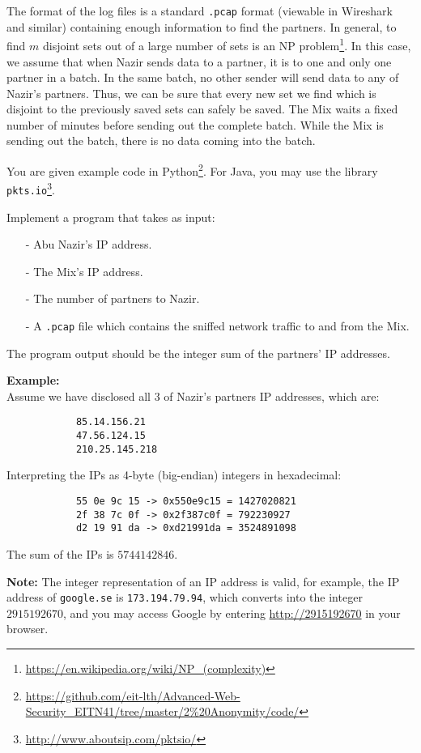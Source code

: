 \documentclass{article}
\begin{document}
\begin{description}
{		The format of the log files is a standard \texttt{.pcap} format (viewable in Wireshark and similar) containing enough information
		to find the partners. In general, to find $m$ disjoint sets out of a large number of sets is an 
		NP problem\footnote{\url{https://en.wikipedia.org/wiki/NP_(complexity)}}. In this case, we assume that when Nazir sends data to a partner,
		it is to one and only one partner in a batch. In the same batch, no other sender will send data to any of Nazir's partners. Thus,
		we can be sure that every new set we find which is disjoint to the previously saved sets can safely be saved.
		The Mix waits a fixed number of minutes before sending out the complete batch. While the Mix is sending out the batch, there is no
		data coming into the batch.

		You are given example code in Python\footnote{\url{https://github.com/eit-lth/Advanced-Web-Security_EITN41/tree/master/2\%20Anonymity/code/}}.
		For Java, you may use the library \texttt{pkts.io}\footnote{\url{http://www.aboutsip.com/pktsio/}}.

		Implement a program that takes as input:
		\begin{itemize}
			\item[-] Abu Nazir's IP address.
			\item[-] The Mix's IP address.
			\item[-] The number of partners to Nazir.
			\item[-] A \texttt{.pcap} file which contains the sniffed network traffic to and from the Mix.
		\end{itemize}
		The program output should be the integer sum of the partners' IP addresses.

		\textbf{Example:}\\
		Assume we have disclosed all 3 of Nazir's partners IP addresses, which are:
		\begin{verbatim}
			85.14.156.21
			47.56.124.15
			210.25.145.218
		\end{verbatim}
		Interpreting the IPs as 4-byte (big-endian) integers in hexadecimal:
		\begin{verbatim}
			55 0e 9c 15 -> 0x550e9c15 = 1427020821
			2f 38 7c 0f -> 0x2f387c0f = 792230927
			d2 19 91 da -> 0xd21991da = 3524891098
		\end{verbatim}
		The sum of the IPs is $5744142846$.

		\textbf{Note:} The integer representation of an IP address is valid, for example, the IP address of \texttt{google.se}
		is \texttt{173.194.79.94}, which converts into the integer $2915192670$, and you may access Google by entering
		\url{http://2915192670} in your browser.

}
\end{description}
\end{document}
